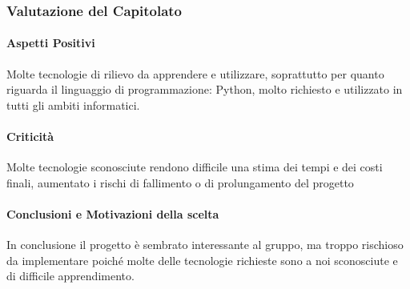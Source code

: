 \subsubsection{Valutazione del Capitolato}

\paragraph{Aspetti Positivi}
Molte tecnologie di rilievo da apprendere e utilizzare, soprattutto per quanto riguarda il linguaggio di programmazione: Python, molto richiesto e utilizzato in tutti gli ambiti informatici. 
\paragraph{Criticità}
Molte tecnologie sconosciute rendono difficile una stima dei tempi e dei costi finali, aumentato i rischi di fallimento o di prolungamento del progetto
\paragraph{Conclusioni e Motivazioni della scelta}
In conclusione il progetto è sembrato interessante al gruppo, ma troppo rischioso da implementare poiché molte delle tecnologie richieste sono a noi sconosciute e di difficile apprendimento. 

